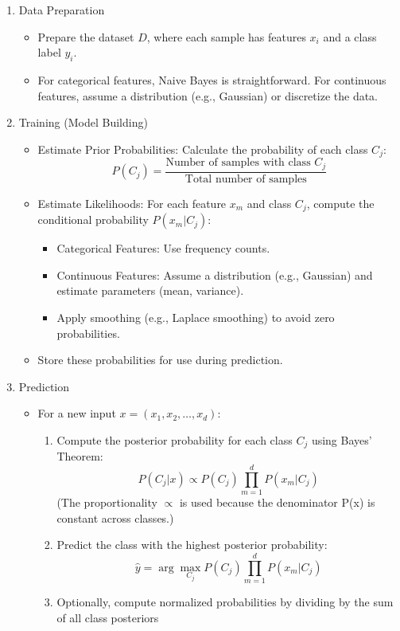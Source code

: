 \begin{enumerate}[label=Step \arabic*:, align=left, leftmargin=20pt,labelsep=1em]
    \item Data Preparation
    \begin{itemize}
        \item Prepare the dataset $D$, where each sample has features $x_i$ and a class label $y_i$.
        \item For categorical features, Naive Bayes is straightforward.
        For continuous features, assume a distribution (e.g., Gaussian) or discretize the data.
    \end{itemize}

    \item Training (Model Building)
    \begin{itemize}
        \item Estimate Prior Probabilities: Calculate the probability of each class $C_j$:
        \[P(C_j) = \frac{\text{Number of samples with class } C_j}{\text{Total number of samples}}\]

        \item Estimate Likelihoods: For each feature $x_m$ and class $C_j$, compute the conditional probability $P(x_m | C_j)$:
        \begin{itemize}
            \item Categorical Features: Use frequency counts.
            \item Continuous Features: Assume a distribution (e.g., Gaussian) and estimate parameters (mean, variance).
            \item Apply smoothing (e.g., Laplace smoothing) to avoid zero probabilities.
        \end{itemize}

        \item Store these probabilities for use during prediction.
    \end{itemize}

    \item Prediction
    \begin{itemize}
        \item For a new input $x = (x_1, x_2, \dots, x_d)$:
        \begin{enumerate}
            \item Compute the posterior probability for each class $C_j$ using Bayes' Theorem:
                \[P(C_j | x) \propto P(C_j) \prod_{m=1}^d P(x_m | C_j)\]
                (The proportionality $\propto$ is used because the denominator P(x) is constant across classes.)

            \item Predict the class with the highest posterior probability:
                \[\hat{y} = \arg\max_{C_j} P(C_j) \prod_{m=1}^d P(x_m | C_j)\]

            \item Optionally, compute normalized probabilities by dividing by the sum of all class posteriors
        \end{enumerate}
    \end{itemize}
\end{enumerate}



